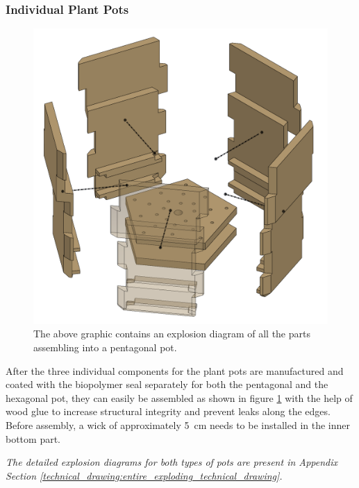 \documentclass[12pt]{extarticle} %
\begin{document}
\subsubsection{Individual Plant Pots}
\begin{figure}[ht]
    \centering
    \includegraphics[scale=0.3]{images/screenshots/exploded_view_pent_pot.png}
    \caption{The above graphic contains an explosion diagram of all the parts assembling into a pentagonal pot.}
    \label{fig:pent_pot_explosion_diagram}
\end{figure}
After the three individual components for the plant pots are manufactured and coated with the biopolymer seal separately for both the pentagonal and the hexagonal pot, they can easily be assembled as shown in figure \ref{fig:pent_pot_explosion_diagram} with the help of wood glue to increase structural integrity and prevent leaks along the edges. Before assembly, a wick of approximately 5 cm needs to be installed in the inner bottom part.

\textit{The detailed explosion diagrams for both types of pots are present in Appendix Section \ref{technical_drawing:entire_exploding_technical_drawing}.}

\pagebreak
\end{document}
